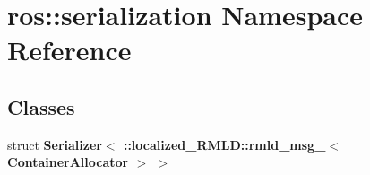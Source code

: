 \section{ros::serialization Namespace Reference}
\label{namespaceros_1_1serialization}
\subsection*{Classes}
\begin{DoxyCompactItemize}
\item 
struct {\bf Serializer$<$ ::localized\_\-RMLD::rmld\_\-msg\_\-$<$ ContainerAllocator $>$ $>$}
\end{DoxyCompactItemize}
